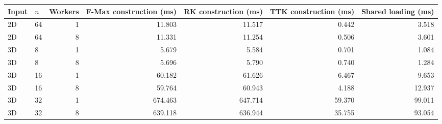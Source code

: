 \begin{tabular}{llrrrrr}
\hline
Input & $n$ & Workers & F-Max construction (ms) & RK construction (ms) & TTK construction (ms) & Shared loading (ms) \\
\hline
2D & 64 & 1 & 11.803 & 11.517 & 0.442 & 3.518 \\
2D & 64 & 8 & 11.331 & 11.254 & 0.506 & 3.601 \\
3D & 8 & 1 & 5.679 & 5.584 & 0.701 & 1.084 \\
3D & 8 & 8 & 5.696 & 5.790 & 0.740 & 1.284 \\
3D & 16 & 1 & 60.182 & 61.626 & 6.467 & 9.653 \\
3D & 16 & 8 & 59.764 & 60.943 & 4.188 & 12.937 \\
3D & 32 & 1 & 674.463 & 647.714 & 59.370 & 99.011 \\
3D & 32 & 8 & 639.118 & 636.944 & 35.755 & 93.054 \\
\hline
\end{tabular}
